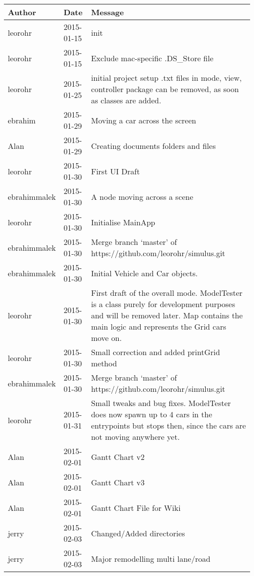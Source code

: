 \begin{center}
\begin{longtabu} to \textwidth {|
    X[4,l]|
    X[3,c]|
    X[8,l]|}
    \hline
    \textbf{Author} & \textbf{Date} & \textbf{Message} \\ \hline
leorohr & 2015-01-15 & init \\ \hline
leorohr & 2015-01-15 & Exclude mac-specific .DS\_Store file \\ \hline
leorohr & 2015-01-25 & initial project setup .txt files in mode, view, controller package can be removed, as soon as classes are added. \\ \hline
ebrahim & 2015-01-29 & Moving a car across the screen \\ \hline
Alan & 2015-01-29 & Creating documents folders and files \\ \hline
leorohr & 2015-01-30 & First UI Draft \\ \hline
ebrahimmalek & 2015-01-30 & A node moving across a scene \\ \hline
leorohr & 2015-01-30 & Initialise MainApp \\ \hline
ebrahimmalek & 2015-01-30 & Merge branch `master' of https://github.com/leorohr/simulus.git \\ \hline
ebrahimmalek & 2015-01-30 & Initial Vehicle and Car objects. \\ \hline
leorohr & 2015-01-30 & First draft of the overall mode. ModelTester is a class purely for development purposes and will be removed later. Map contains the main logic and represents the Grid cars move on. \\ \hline
leorohr & 2015-01-30 & Small correction and added printGrid method \\ \hline
ebrahimmalek & 2015-01-30 & Merge branch `master' of https://github.com/leorohr/simulus.git \\ \hline
leorohr & 2015-01-31 & Small tweaks and bug fixes. ModelTester does now spawn up to 4 cars in the entrypoints but stops then, since the cars are not moving anywhere yet. \\ \hline
Alan & 2015-02-01 & Gantt Chart v2 \\ \hline
Alan & 2015-02-01 & Gantt Chart v3 \\ \hline
Alan & 2015-02-01 & Gantt Chart File for Wiki \\ \hline
jerry & 2015-02-03 & Changed/Added directories \\ \hline
jerry & 2015-02-03 & Major remodelling multi lane/road \\ \hline

\end{longtabu}
\end{center}
